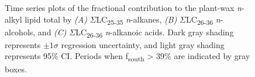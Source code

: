 \begin{figure}[p]
	\caption[Time-series plots of compound-class contribution]{Time series plots of the fractional contribution to the plant-wax \textit{n}-alkyl lipid total by \textit{(A)} $\Sigma$LC\textsubscript{25-35} \textit{n}-alkanes, \textit{(B)} $\Sigma$LC\textsubscript{26-36} \textit{n}-alcohols, and \textit{(C)} $\Sigma$LC\textsubscript{26-36} \textit{n}-alkanoic acids. Dark gray shading represents $\pm 1 \sigma$ regression uncertainty, and light gray shading represents 95\% CI. Periods when f\textsubscript{south} > 39\% are indicated by gray boxes.}
	\label{Ch4Fig:9} 
\end{figure}

